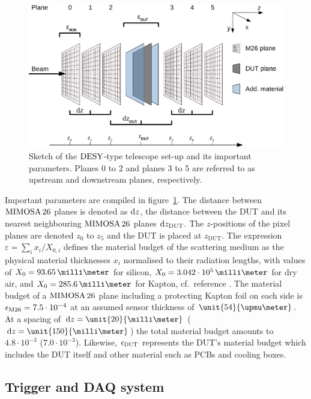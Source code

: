 \begin{figure}[tb]
	\center
	\includegraphics[width=.9\textwidth]{figures/sketch_tscope6}
	\caption[Sketch of the $\DESY$-type telescope set-up]{Sketch of the $\DESY$-type telescope set-up and its important parameters.
	Planes 0 to 2 and planes 3 to 5 are referred to as upstream and downstream planes, respectively.}
	\label{fig:datura_sketch}
\end{figure}

Important parameters are compiled in figure~\ref{fig:datura_sketch}. 
The distance between $\textrm{MIMOSA\,26}$ planes is denoted as $\textrm{d}z$, the distance between the DUT and its nearest neighbouring $\textrm{MIMOSA\,26}$ planes $\textrm{d}z_{\textrm{DUT}}$. 
The $z$-positions of the pixel planes are denoted $z_0$ to $z_5$ and the DUT is placed at $z_{\textrm{DUT}}$. 
The expression $\varepsilon = \sum_i x_{i}/X_{0,i}$ defines the material budget of the scattering medium as the physical material thicknesses $x_i$ normalised to their radiation lengths,
 with values of $X_0 = 93.65\,\milli\meter$ for silicon, $X_0 = 3.042\cdot 10^{5}\,\milli\meter$ for dry air, and $X_0 = 285.6\,\milli\meter$ for Kapton, cf.~reference \cite{ref:x0values}.
The material budget of a $\textrm{MIMOSA\,26}$ plane including a protecting Kapton foil on each side is $\mathnormal{\epsilon_{\textrm{M26}}} = 7.5\cdot10^{-4}$ at an assumed sensor thickness of $\unit{54}{\upmu\meter}$. 
At a spacing of $\dz = \unit{20}{\milli\meter}$ ($\dz = \unit{150}{\milli\meter}$) the total material budget amounts to $4.8\cdot10^{-3}$ ($7.0\cdot10^{-3}$).
Likewise, $\mathnormal{\epsilon_{\textrm{DUT}}}$ represents the DUT's material budget which includes the DUT itself and other material such as PCBs and cooling boxes.

\subsection{Trigger and DAQ system}
\label{sec:tdaq}

